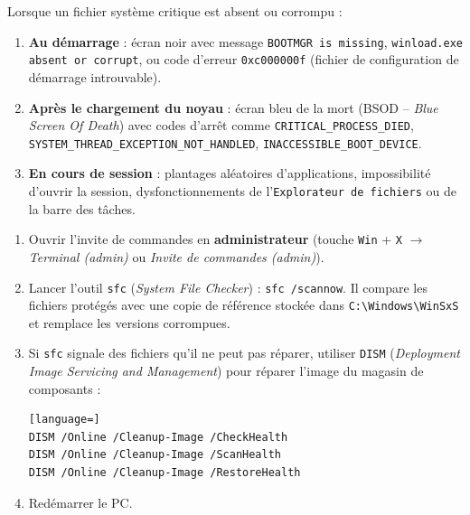 \documentclass[11pt]{article}
\newcommand{\cle}[1]{{\popxbold\color{popdark}#1}}
\begin{document}
\begin{propriete}
Lorsque un fichier système critique est absent ou corrompu :
\begin{enumerate}
    \item \textbf{Au démarrage} : écran noir avec message \texttt{BOOTMGR is missing}, \texttt{winload.exe absent or corrupt}, ou code d'erreur \texttt{0xc000000f} (fichier de configuration de démarrage introuvable).
    \item \textbf{Après le chargement du noyau} : \cle{écran bleu de la mort} (\cle{BSOD} -- \emph{Blue Screen Of Death}) avec codes d'arrêt comme \texttt{CRITICAL\_PROCESS\_DIED}, \texttt{SYSTEM\_THREAD\_EXCEPTION\_NOT\_HANDLED}, \texttt{INACCESSIBLE\_BOOT\_DEVICE}.
    \item \textbf{En cours de session} : plantages aléatoires d'applications, impossibilité d'ouvrir la session, dysfonctionnements de l'\texttt{Explorateur de fichiers} ou de la barre des tâches.
\end{enumerate}
\end{propriete}

\begin{methode}
\begin{enumerate}
    \item Ouvrir l'invite de commandes en \textbf{administrateur} (touche \texttt{Win} + \texttt{X} $\rightarrow$ \emph{Terminal (admin)} ou \emph{Invite de commandes (admin)}).
    \item Lancer l'outil \texttt{sfc} (\emph{System File Checker}) : \texttt{sfc /scannow}. Il compare les fichiers protégés avec une copie de référence stockée dans \texttt{C:\textbackslash Windows\textbackslash WinSxS} et remplace les versions corrompues.
    \item Si \texttt{sfc} signale des fichiers qu'il ne peut pas réparer, utiliser \texttt{DISM} (\emph{Deployment Image Servicing and Management}) pour réparer l'image du magasin de composants :
    \begin{lstlisting}[language=]
DISM /Online /Cleanup-Image /CheckHealth
DISM /Online /Cleanup-Image /ScanHealth
DISM /Online /Cleanup-Image /RestoreHealth
    \end{lstlisting}
    \item Redémarrer le PC.
\end{enumerate}
\end{methode}
\end{document}

